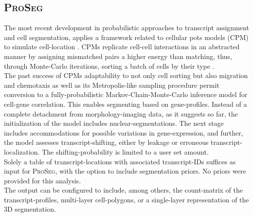 \subsection*{\color{proseg}\textsc{ProSeg}}
The most recent development in probabilistic approaches to transcript assignment and cell segmentation, applies a framework related to cellular pots models (CPM) to simulate cell-location \cite{jones_cell_2025}. CPMs replicate cell-cell interactions in an abstracted manner by assigning mismatched pairs a higher energy than matching, thus, through Monte-Carlo iterations, sorting a batch of cells by their type \cite{graner_simulation_1992}.\\
The past success of CPMs adaptability to not only cell sorting but also migration and chemotaxis as well as its Metropolis-like sampling procedure permit conversion to a fully-probabilistic Markov-Chain-Monte-Carlo inference model for cell-gene correlation. This enables segmenting based on gene-profiles. Instead of a complete detachment from morphology-imaging data, as it suggests so far, the initialization of the model includes nuclear-segmentations. The next stage includes accommodations for possible variations in gene-expression, and further, the model assesses transcript-shifting, either by leakage or erroneous transcript-localization. The shifting-probability is limited to a user set amount.\\
Solely a table of transcript-locations with associated transcript-IDs suffices as input for \textsc{ProSeg}, with the option to include segmentation priors. No priors were provided for this analysis.\\
The output can be configured to include, among others, the count-matrix of the transcript-profiles, multi-layer cell-polygons, or a single-layer representation of the 3D segmentation.
